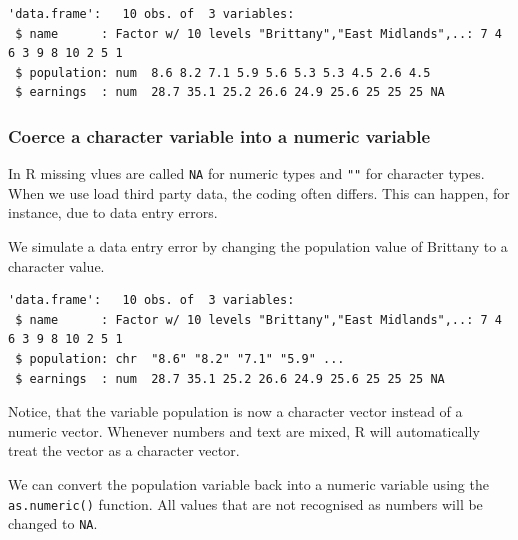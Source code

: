 \documentclass[]{article}
\newenvironment{Shaded}{\begin{snugshade}}{\end{snugshade}}
\newcommand{\KeywordTok}[1]{\textcolor[rgb]{0.13,0.29,0.53}{\textbf{#1}}}
\newcommand{\NormalTok}[1]{#1}
\newcommand{\OperatorTok}[1]{\textcolor[rgb]{0.81,0.36,0.00}{\textbf{#1}}}
\newcommand{\StringTok}[1]{\textcolor[rgb]{0.31,0.60,0.02}{#1}}
\begin{document}
\begin{verbatim}
'data.frame':   10 obs. of  3 variables:
 $ name      : Factor w/ 10 levels "Brittany","East Midlands",..: 7 4 6 3 9 8 10 2 5 1
 $ population: num  8.6 8.2 7.1 5.9 5.6 5.3 5.3 4.5 2.6 4.5
 $ earnings  : num  28.7 35.1 25.2 26.6 24.9 25.6 25 25 25 NA
\end{verbatim}

\hypertarget{coerce-a-character-variable-into-a-numeric-variable}{%
\subsubsection{Coerce a character variable into a numeric variable}\label{coerce-a-character-variable-into-a-numeric-variable}}

In R missing vlues are called \texttt{NA} for numeric types and \texttt{""} for character types. When we use load third party data, the coding often differs. This can happen, for instance, due to data entry errors.

We simulate a data entry error by changing the population value of Brittany to a character value.

\begin{Shaded}
\end{Shaded}

\begin{verbatim}
'data.frame':   10 obs. of  3 variables:
 $ name      : Factor w/ 10 levels "Brittany","East Midlands",..: 7 4 6 3 9 8 10 2 5 1
 $ population: chr  "8.6" "8.2" "7.1" "5.9" ...
 $ earnings  : num  28.7 35.1 25.2 26.6 24.9 25.6 25 25 25 NA
\end{verbatim}

Notice, that the variable population is now a character vector instead of a numeric vector. Whenever numbers and text are mixed, R will automatically treat the vector as a character vector.

We can convert the population variable back into a numeric variable using the \texttt{as.numeric()} function. All values that are not recognised as numbers will be changed to \texttt{NA}.

\begin{Shaded}
\end{Shaded}
\end{document}
